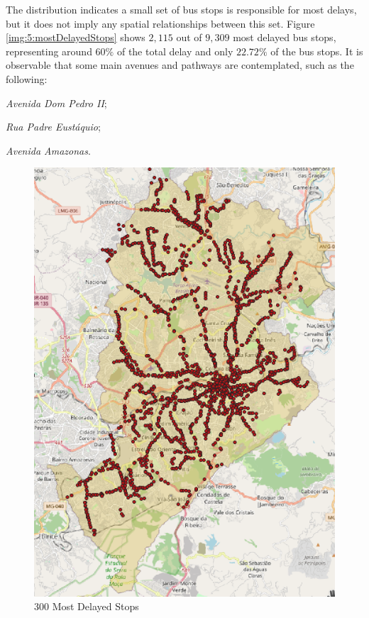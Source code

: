 The distribution indicates a small set of bus stops is responsible for most delays, but it does not imply any spatial relationships between this set. Figure \ref{img:5:mostDelayedStops} shows $2,115$ out of $9,309$ most delayed bus stops, representing around $60\%$ of the total delay and only $22.72\%$ of the bus stops. It is observable that some main avenues
and pathways are contemplated, such as the following:
\begin{enumerate*}
    \item \textit{Avenida Dom Pedro II};
    \item \textit{Rua Padre Eustáquio};
    \item \textit{Avenida Amazonas}.
\end{enumerate*}

\begin{figure}[h]
\centering
\begin{minipage}[t]{.5\textwidth}
  \centering
  \caption{300 Most Delayed Stops}
  \includegraphics[width=.90\linewidth]{imagem/cap5/mostDelayedStops.png}

\end{minipage}
\end{figure}
